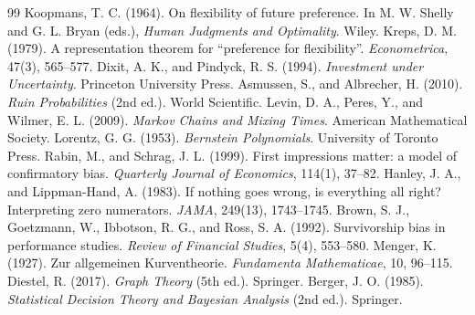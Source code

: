 \documentclass[11pt]{article}
\theoremstyle{remark}
\begin{document}
\begin{thebibliography}{99}
 Koopmans, T. C. (1964). On flexibility of future preference. In M. W. Shelly and G. L. Bryan (eds.), \emph{Human Judgments and Optimality}. Wiley.
 Kreps, D. M. (1979). A representation theorem for ``preference for flexibility''. \emph{Econometrica}, 47(3), 565--577.
 Dixit, A. K., and Pindyck, R. S. (1994). \emph{Investment under Uncertainty}. Princeton University Press.
 Asmussen, S., and Albrecher, H. (2010). \emph{Ruin Probabilities} (2nd ed.). World Scientific.
 Levin, D. A., Peres, Y., and Wilmer, E. L. (2009). \emph{Markov Chains and Mixing Times}. American Mathematical Society.
 Lorentz, G. G. (1953). \emph{Bernstein Polynomials}. University of Toronto Press.
 Rabin, M., and Schrag, J. L. (1999). First impressions matter: a model of confirmatory bias. \emph{Quarterly Journal of Economics}, 114(1), 37--82.
 Hanley, J. A., and Lippman-Hand, A. (1983). If nothing goes wrong, is everything all right? Interpreting zero numerators. \emph{JAMA}, 249(13), 1743--1745.
 Brown, S. J., Goetzmann, W., Ibbotson, R. G., and Ross, S. A. (1992). Survivorship bias in performance studies. \emph{Review of Financial Studies}, 5(4), 553--580.
 Menger, K. (1927). Zur allgemeinen Kurventheorie. \emph{Fundamenta Mathematicae}, 10, 96--115.
 Diestel, R. (2017). \emph{Graph Theory} (5th ed.). Springer.
 Berger, J. O. (1985). \emph{Statistical Decision Theory and Bayesian Analysis} (2nd ed.). Springer.
\end{thebibliography}
\end{document}
